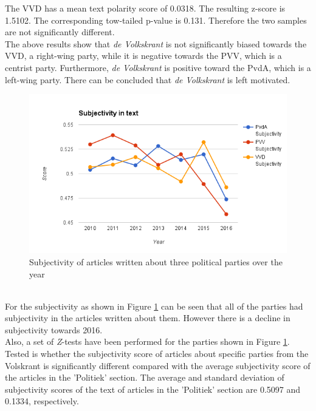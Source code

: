 The VVD has a mean text polarity score of 0.0318. The resulting z-score is 1.5102. The corresponding tow-tailed p-value is 0.131. Therefore the two samples are not significantly different. \\

The above results show that {\it de Volkskrant} is not significantly biased towards the VVD, a right-wing party, while it is negative towards the PVV, which is a centrist party. Furthermore, {\it de Volkskrant} is positive toward the PvdA, which is a left-wing party. There can be concluded that {\it de Volkskrant} is left motivated. \\

    \begin{figure}[ht]
        \centering
        \includegraphics[scale=0.40]{Graphs/Subjectivity}
        \caption{Subjectivity of articles written about three political parties over the year}
        \label{fig:subjectivity}
    \end{figure}
    \\
For the subjectivity as shown in Figure \ref{fig:subjectivity} can be seen that all of the parties had subjectivity in the articles written about them. However there is a decline in subjectivity towards 2016. \\

Also, a set of {\it Z}-tests have been performed for the parties shown in Figure \ref{fig:subjectivity}. Tested is whether the subjectivity score of articles about specific parties from the Volskrant is significantly different compared with the average subjectivity score of the articles in the 'Politiek' section. 
The average and standard deviation of subjectivity scores of the text of articles in the 'Politiek' section are 0.5097 and 0.1334, respectively. \\

